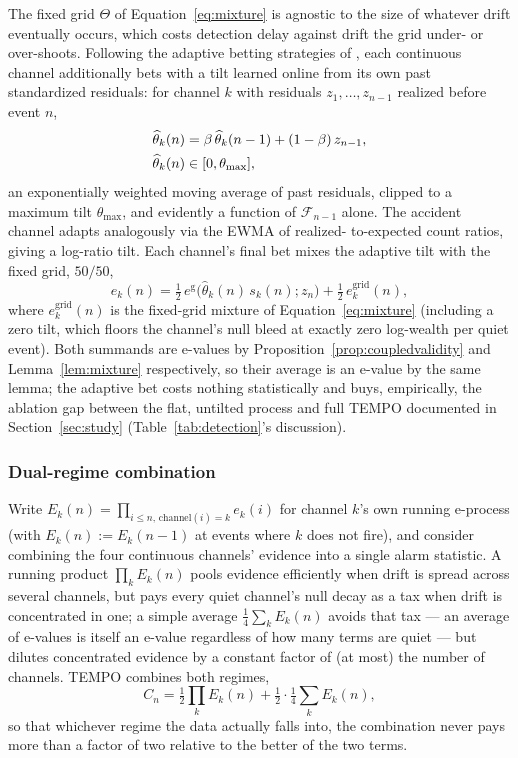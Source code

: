 \documentclass[trsc,dblanonrev]{informs4}
\newcommand{\F}{\mathcal{F}}
\begin{document}
The fixed grid $\Theta$ of Equation~\eqref{eq:mixture} is agnostic to
the size of whatever drift eventually occurs, which costs detection
delay against drift the grid under- or over-shoots. Following the
adaptive betting strategies of \citet{waudbysmithramdas2024}, each
continuous channel additionally bets with a tilt learned online from
its own past standardized residuals: for channel $k$ with residuals
$z_1, \dots, z_{n-1}$ realized before event $n$,
\begin{align}
\widehat\theta_k(n) &= \beta\, \widehat\theta_k(n-1) + (1-\beta)\,
z_{n-1}, \label{eq:ewma}\\
\widehat\theta_k(n) &\in [0, \theta_{\max}], \notag
\end{align}
an exponentially weighted moving average of past residuals, clipped to
a maximum tilt $\theta_{\max}$, and evidently a function of $\F_{n-1}$
alone. The accident channel adapts analogously via the EWMA of realized-
to-expected count ratios, giving a log-ratio tilt. Each channel's final
bet mixes the adaptive tilt with the fixed grid, $50/50$,
\begin{equation}\label{eq:adaptivebet}
e_k(n) = \tfrac{1}{2}\, e^{\mathrm g}\bigl(\widehat\theta_k(n)\, s_k(n);
z_n\bigr) + \tfrac{1}{2}\, e_k^{\mathrm{grid}}(n),
\end{equation}
where $e_k^{\mathrm{grid}}(n)$ is the fixed-grid mixture of
Equation~\eqref{eq:mixture} (including a zero tilt, which floors the
channel's null bleed at exactly zero log-wealth per quiet event). Both
summands are e-values by Proposition~\ref{prop:coupledvalidity} and
Lemma~\ref{lem:mixture} respectively, so their average is an e-value by
the same lemma; the adaptive bet costs nothing statistically and buys,
empirically, the ablation gap between the flat, untilted process and
full TEMPO documented in Section~\ref{sec:study}
(Table~\ref{tab:detection}'s discussion).

\subsubsection{Dual-regime combination}

Write $E_k(n) = \prod_{i \le n,\, \mathrm{channel}(i) = k} e_k(i)$ for
channel $k$'s own running e-process (with $E_k(n) := E_k(n-1)$ at
events where $k$ does not fire), and consider combining the four
continuous channels' evidence into a single alarm statistic. A running
product $\prod_k E_k(n)$ pools evidence efficiently when drift is
spread across several channels, but pays every quiet channel's null
decay as a tax when drift is concentrated in one; a simple average
$\tfrac{1}{4}\sum_k E_k(n)$ avoids that tax --- an average of e-values
is itself an e-value regardless of how many terms are quiet --- but
dilutes concentrated evidence by a constant factor of (at most) the
number of channels. TEMPO combines both regimes,
\begin{equation}\label{eq:dualregime}
C_n = \tfrac{1}{2} \prod_{k} E_k(n) + \tfrac{1}{2}\cdot
\tfrac{1}{4}\sum_{k} E_k(n),
\end{equation}
so that whichever regime the data actually falls into, the combination
never pays more than a factor of two relative to the better of the two
terms.
\end{document}
